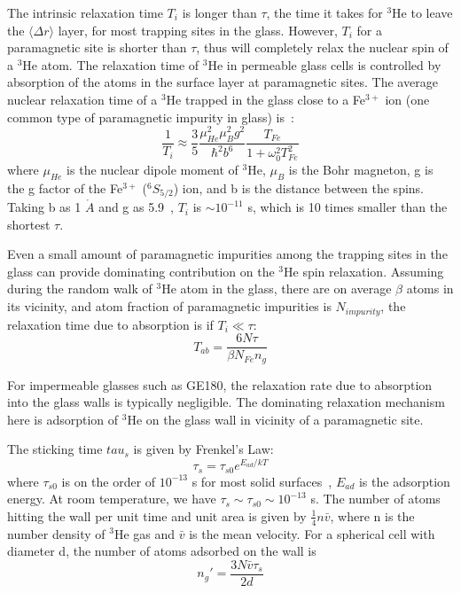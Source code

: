 The intrinsic relaxation time $T_{i}$ is longer than $\tau$, the time it takes for $^{3}$He to leave the $\langle\Delta r\rangle$ layer, for most trapping sites in the glass. However, $T_{i}$ for a paramagnetic site is shorter than $\tau$, thus will completely relax the nuclear spin of a $^{3}$He atom. The relaxation time of $^{3}$He in permeable glass cells is controlled by absorption of the atoms in the surface layer at paramagnetic sites. The average nuclear relaxation time of a $^{3}$He trapped in the glass close to a Fe$^{3+}$ ion (one common type of paramagnetic impurity in glass) is~\cite{Abragam}:
\begin{equation}
\frac{1}{T_i}\approx\frac{3}{5}\frac{\mu_{He}^{2}\mu_{B}^{2}g^2}
{\hbar^2b^6}\frac{T_{Fe}}{1+\omega_0^2T_{Fe}^2}
\end{equation}
where $\mu_{He}$ is the nuclear dipole moment of $^{3}$He, $\mu_B$ is the Bohr magneton, g is the g factor of the Fe$^{3+}$ ($^{6}S_{5/2}$) ion, and b is the distance between the spins. Taking b as 1 $\mathring{A}$ and g as 5.9~\cite{Kittel}, $T_i$ is $\sim10^{-11}$ s, which is 10 times smaller than the shortest $\tau$.

Even a small amount of paramagnetic impurities among the trapping sites in the glass can provide dominating contribution on the $^{3}$He spin relaxation. Assuming during the random walk of $^{3}$He atom in the glass, there are on average $\beta$ atoms in its vicinity, and atom fraction of paramagnetic impurities is $N_{impurity}$, the relaxation time due to absorption is if $T_i\ll\tau$:
\begin{equation}\label{T_ab}
T_{ab}=\frac{6N\tau}{\beta N_{Fe}n_g}
\end{equation}

For impermeable glasses such as GE180, the relaxation rate due to absorption into the glass walls is typically negligible. The dominating relaxation mechanism here is adsorption of $^{3}$He on the glass wall in vicinity of a paramagnetic site.

The sticking time $tau_s$ is given by Frenkel's Law:
\begin{equation}\label{sticking_time}
\tau_s=\tau_{s0}e^{E_{ad}/kT}
\end{equation}
where $\tau_{s0}$ is on the order of $10^{-13}$ s for most solid surfaces~\cite{Frenkel}, $E_{ad}$ is the adsorption energy. At room temperature, we have $\tau_s\sim\tau_{s0}\sim 10^{-13}$ s. The number of atoms hitting the wall per unit time and unit area is given by $\frac{1}{4}n\bar{v}$, where n is the number density of $^{3}$He gas and $\bar{v}$ is the mean velocity. For a spherical cell with diameter d, the number of atoms adsorbed on the wall is
\begin{equation}\label{adsorption_ng}
n_{g}'=\frac{3N\bar{v}\tau_s}{2d}
\end{equation}

